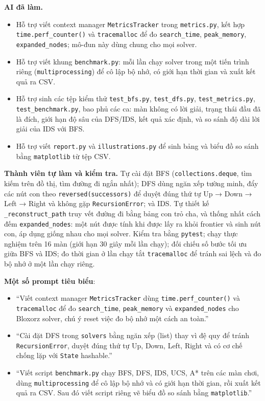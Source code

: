 \textbf{AI đã làm.}
\begin{itemize}
\item Hỗ trợ viết context manager \texttt{MetricsTracker} trong \texttt{metrics.py}, kết hợp \texttt{time.perf\_counter()} và \texttt{tracemalloc} để đo \texttt{search\_time}, \texttt{peak\_memory}, \texttt{expanded\_nodes}; mô-đun này dùng chung cho mọi solver.
\item Hỗ trợ viết khung \texttt{benchmark.py}: mỗi lần chạy solver trong một tiến trình riêng (\texttt{multiprocessing}) để cô lập bộ nhớ, có giới hạn thời gian và xuất kết quả ra CSV.
\item Hỗ trợ sinh các tệp kiểm thử \texttt{test\_bfs.py}, \texttt{test\_dfs.py}, \texttt{test\_metrics.py}, \texttt{test\_benchmark.py}, bao phủ các ca: màn không có lời giải, trạng thái đầu đã là đích, giới hạn độ sâu của DFS/IDS, kết quả xác định, và so sánh độ dài lời giải của IDS với BFS.
\item Hỗ trợ viết \texttt{report.py} và \texttt{illustrations.py} để sinh bảng và biểu đồ so sánh bằng \texttt{matplotlib} từ tệp CSV.
\end{itemize}

\textbf{Thành viên tự làm và kiểm tra.} Tự cài đặt BFS (\texttt{collections.deque}, tìm kiếm trên đồ thị, tìm đường đi ngắn nhất); DFS dùng ngăn xếp tường minh, đẩy các nút con theo \texttt{reversed(successors)} để duyệt đúng thứ tự Up → Down → Left → Right và không gặp \texttt{RecursionError}; và IDS. Tự thiết kế \texttt{\_reconstruct\_path} truy vết đường đi bằng bảng con trỏ cha, và thống nhất cách đếm \texttt{expanded\_nodes}: một nút được tính khi được lấy ra khỏi frontier và sinh nút con, áp dụng giống nhau cho mọi solver. Kiểm tra bằng \texttt{pytest}; chạy thực nghiệm trên 16 màn (giới hạn 30 giây mỗi lần chạy); đối chiếu số bước tối ưu giữa BFS và IDS; đo thời gian ở lần chạy tắt \texttt{tracemalloc} để tránh sai lệch và đo bộ nhớ ở một lần chạy riêng.

\textbf{Một số prompt tiêu biểu}:
\begin{itemize}
\item ``Viết context manager \texttt{MetricsTracker} dùng \texttt{time.perf\_counter()} và \texttt{tracemalloc} để đo \texttt{search\_time}, \texttt{peak\_memory} và \texttt{expanded\_nodes} cho Bloxorz solver, chú ý reset việc đo bộ nhớ một cách an toàn.''
\item ``Cài đặt DFS trong \texttt{solvers} bằng ngăn xếp (list) thay vì đệ quy để tránh \texttt{RecursionError}, duyệt đúng thứ tự Up, Down, Left, Right và có cơ chế chống lặp với \texttt{State} hashable.''
\item ``Viết script \texttt{benchmark.py} chạy BFS, DFS, IDS, UCS, A* trên các màn chơi, dùng \texttt{multiprocessing} để cô lập bộ nhớ và có giới hạn thời gian, rồi xuất kết quả ra CSV. Sau đó viết script riêng vẽ biểu đồ so sánh bằng \texttt{matplotlib}.''
\end{itemize}

\fussy
